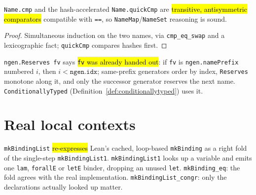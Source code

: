 \begin{lemma}
\label{family:name-cmp}
\leanok
{} \texttt{Name.cmp} and the hash-accelerated \texttt{Name.quickCmp} are \hl{transitive, antisymmetric comparators} compatible with \texttt{==}, so \texttt{NameMap}/\texttt{NameSet} reasoning is sound.
\end{lemma}
\begin{proof}
\leanok
{} Simultaneous induction on the two names, via \texttt{cmp\_eq\_swap} and a lexicographic fact; \texttt{quickCmp} compares hashes first.
\end{proof}

\begin{definition}
\label{def:ngen-reserves}
\leanok
{} \texttt{ngen.Reserves fv} says \hl{\texttt{fv} was already handed out}: if \texttt{fv} is \texttt{ngen.namePrefix} numbered $i$, then $i < \texttt{ngen.idx}$; same-prefix generators order by index, \texttt{Reserves} monotone along it, and only the successor generator reserves the next name. \texttt{ConditionallyTyped} (Definition~\ref{def:conditionallytyped}) uses it.
\end{definition}

\section{Real local contexts}

\begin{definition}
\label{def:mkbindinglist}
\leanok
{} \texttt{mkBindingList} \hl{re-expresses} Lean's cached, loop-based \texttt{mkBinding} as a right fold of the single-step \texttt{mkBindingList1}. \texttt{mkBindingList1} looks up a variable and emits one \texttt{lam}, \texttt{forallE} or \texttt{letE} binder, dropping an unused \texttt{let}. \texttt{mkBinding\_eq}: the fold agrees with the real implementation. \texttt{mkBindingList\_congr}: only the declarations actually looked up matter.
\end{definition}

